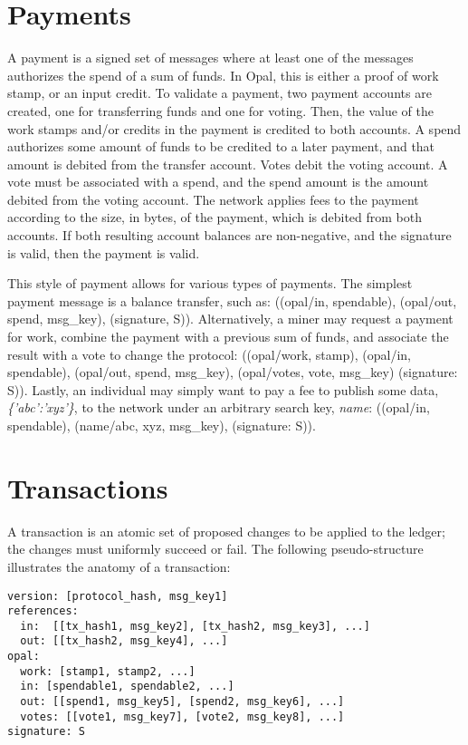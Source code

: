 \documentclass[10pt,twocolumn]{article}
\begin{document}
\section{Payments}
A payment is a signed set of messages where at least one of the messages authorizes the spend of a sum of funds.  In Opal, this is either a proof of work stamp, or an input credit.  To validate a payment, two payment accounts are created, one for transferring funds and one for voting.  Then, the value of the work stamps and/or credits in the payment is credited to both accounts.  A spend authorizes some amount of funds to be credited to a later payment, and that amount is debited from the transfer account.  Votes debit the voting account.  A vote must be associated with a spend, and the spend amount is the amount debited from the voting account.  The network applies fees to the payment according to the size, in bytes, of the payment, which is debited from both accounts.  If both resulting account balances are non-negative, and the signature is valid, then the payment is valid.

This style of payment allows for various types of payments.  The simplest payment message is a balance transfer, such as:  ((opal/in, spendable), (opal/out, spend, msg\_key), (signature, S)).  Alternatively, a miner may request a payment for work, combine the payment with a previous sum of funds, and associate the result with a vote to change the protocol:  ((opal/work, stamp), (opal/in, spendable), (opal/out, spend, msg\_key), (opal/votes, vote, msg\_key) (signature: S)).  Lastly, an individual may simply want to pay a fee to publish some data, {\em \{'abc':'xyz'\}}, to the network under an arbitrary search key, {\em name}:  ((opal/in, spendable), (name/abc, xyz, msg\_key), (signature: S)).

\section{Transactions}
A transaction is an atomic set of proposed changes to be applied to the ledger; the changes must uniformly succeed or fail.  The following pseudo-structure illustrates the anatomy of a transaction:

\begin{verbatim}
version: [protocol_hash, msg_key1]
references: 
  in:  [[tx_hash1, msg_key2], [tx_hash2, msg_key3], ...]
  out: [[tx_hash2, msg_key4], ...]
opal:
  work: [stamp1, stamp2, ...]
  in: [spendable1, spendable2, ...]
  out: [[spend1, msg_key5], [spend2, msg_key6], ...]
  votes: [[vote1, msg_key7], [vote2, msg_key8], ...]
signature: S
\end{verbatim}
\end{document}
